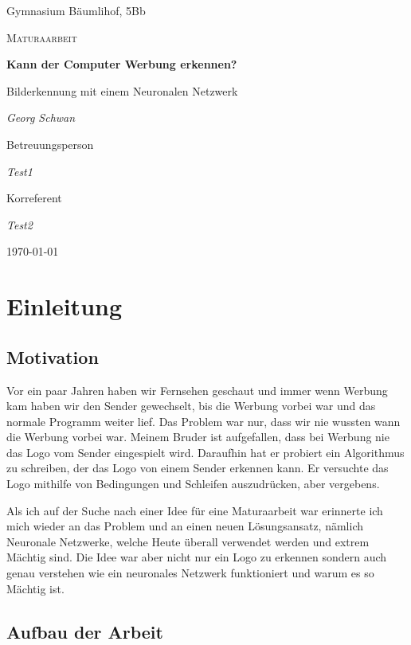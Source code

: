 \documentclass[12pt,a4paper]{report}
\begin{document}
\begin{titlepage}
	\centering
	{\Large Gymnasium Bäumlihof, 5Bb \par}
	\vspace{1cm}
	{\LARGE\scshape Maturaarbeit\par}
	\vspace{1.5cm}
	{\huge\bfseries Kann der Computer Werbung erkennen?\par}
	\vspace{0.6cm}
    {\Large Bilderkennung mit einem Neuronalen Netzwerk\par}
	\vspace{2cm}
	{\Large\itshape Georg Schwan\par}
	\vfill
	Betreuungsperson\par
	{\itshape Test1\par}
	Korreferent\par
	{\itshape Test2}
	\vfill
	{\large \today\par}
\end{titlepage}

\tableofcontents

\newpage

\chapter{Einleitung}\label{ch:einleitung}

\section{Motivation}
\label{sec:motivation}
Vor ein paar Jahren haben wir Fernsehen geschaut und immer wenn Werbung kam haben wir den Sender gewechselt,
bis die Werbung vorbei war und das normale Programm weiter lief.
Das Problem war nur, dass wir nie wussten wann die Werbung vorbei war.
Meinem Bruder ist aufgefallen, dass bei Werbung nie das Logo vom Sender eingespielt wird.
Daraufhin hat er probiert ein Algorithmus zu schreiben, der das Logo von einem Sender erkennen kann.
Er versuchte das Logo mithilfe von Bedingungen und Schleifen auszudrücken, aber vergebens.

Als ich auf der Suche nach einer Idee für eine Maturaarbeit war erinnerte ich mich wieder an das Problem und an einen neuen Lösungsansatz,
nämlich Neuronale Netzwerke, welche Heute überall verwendet werden und extrem Mächtig sind.
Die Idee war aber nicht nur ein Logo zu erkennen sondern auch genau verstehen wie ein neuronales Netzwerk funktioniert und warum es so Mächtig ist.
\section{Aufbau der Arbeit}
\label{sec:aufbauDerArbeit}
\end{document}
